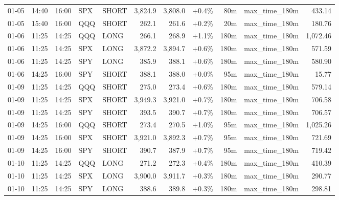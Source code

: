 \documentclass[11pt,a4paper,twoside]{article}
\begin{document}
\begin{center}
\begin{longtable}{>{\color{txtmain}}l l l l l r r r r >{\color{txtmain}}l r}
01-05 & 14:40 & 16:00 & SPX & SHORT & 3,824.9 & 3,808.0 & \textcolor{wingreen}{+0.4\%} & 80m & max\_time\_180m & \textcolor{wingreen}{433.14} \\
01-05 & 15:40 & 16:00 & QQQ & SHORT & 262.1 & 261.6 & \textcolor{wingreen}{+0.2\%} & 20m & max\_time\_180m & \textcolor{wingreen}{180.76} \\
01-06 & 11:25 & 14:25 & QQQ & LONG & 266.1 & 268.9 & \textcolor{wingreen}{+1.1\%} & 180m & max\_time\_180m & \textcolor{wingreen}{1,072.46} \\
01-06 & 11:25 & 14:25 & SPX & LONG & 3,872.2 & 3,894.7 & \textcolor{wingreen}{+0.6\%} & 180m & max\_time\_180m & \textcolor{wingreen}{571.59} \\
01-06 & 11:25 & 14:25 & SPY & LONG & 385.9 & 388.1 & \textcolor{wingreen}{+0.6\%} & 180m & max\_time\_180m & \textcolor{wingreen}{580.90} \\
01-06 & 14:25 & 16:00 & SPY & SHORT & 388.1 & 388.0 & \textcolor{wingreen}{+0.0\%} & 95m & max\_time\_180m & \textcolor{wingreen}{15.77} \\
01-09 & 11:25 & 14:25 & QQQ & SHORT & 275.0 & 273.4 & \textcolor{wingreen}{+0.6\%} & 180m & max\_time\_180m & \textcolor{wingreen}{579.14} \\
01-09 & 11:25 & 14:25 & SPX & SHORT & 3,949.3 & 3,921.0 & \textcolor{wingreen}{+0.7\%} & 180m & max\_time\_180m & \textcolor{wingreen}{706.58} \\
01-09 & 11:25 & 14:25 & SPY & SHORT & 393.5 & 390.7 & \textcolor{wingreen}{+0.7\%} & 180m & max\_time\_180m & \textcolor{wingreen}{706.57} \\
01-09 & 14:25 & 16:00 & QQQ & SHORT & 273.4 & 270.5 & \textcolor{wingreen}{+1.0\%} & 95m & max\_time\_180m & \textcolor{wingreen}{1,025.26} \\
01-09 & 14:25 & 16:00 & SPX & SHORT & 3,921.0 & 3,892.3 & \textcolor{wingreen}{+0.7\%} & 95m & max\_time\_180m & \textcolor{wingreen}{721.69} \\
01-09 & 14:25 & 16:00 & SPY & SHORT & 390.7 & 387.9 & \textcolor{wingreen}{+0.7\%} & 95m & max\_time\_180m & \textcolor{wingreen}{719.42} \\
01-10 & 11:25 & 14:25 & QQQ & LONG & 271.2 & 272.3 & \textcolor{wingreen}{+0.4\%} & 180m & max\_time\_180m & \textcolor{wingreen}{410.39} \\
01-10 & 11:25 & 14:25 & SPX & LONG & 3,900.0 & 3,911.7 & \textcolor{wingreen}{+0.3\%} & 180m & max\_time\_180m & \textcolor{wingreen}{290.77} \\
01-10 & 11:25 & 14:25 & SPY & LONG & 388.6 & 389.8 & \textcolor{wingreen}{+0.3\%} & 180m & max\_time\_180m & \textcolor{wingreen}{298.81} \\

\end{longtable}
\end{center}
\end{document}
